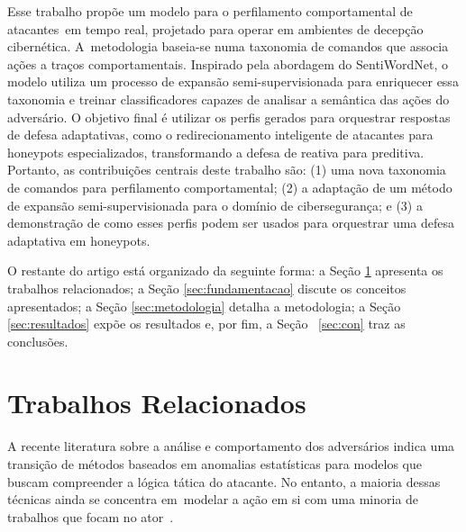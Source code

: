 \documentclass[12pt]{article}
\newcommand{\as}[1]{\textcolor{blue}{{\bf #1}}}
\newcommand{\tachar}[1]{\textcolor{red}{\sout{#1}}}
\begin{document}
Esse trabalho propõe um modelo para o perfilamento comportamental de atacantes~em tempo real, projetado para operar em ambientes de decepção cibernética. A~metodologia baseia-se numa taxonomia de comandos que associa ações a traços comportamentais. Inspirado pela abordagem do SentiWordNet\cite{sentiword3}, o modelo utiliza um processo de expansão semi-supervisionada para enriquecer essa taxonomia e treinar classificadores capazes de analisar a semântica das ações do adversário. O objetivo final é utilizar os perfis gerados para orquestrar respostas de defesa adaptativas,  como o redirecionamento inteligente de atacantes para honeypots especializados, transformando a defesa de reativa para preditiva. Portanto, as contribuições centrais deste trabalho são: (1) uma nova taxonomia de comandos para perfilamento comportamental; (2) a adaptação de um método de expansão semi-supervisionada para o domínio de cibersegurança; e (3) a demonstração de como esses perfis podem ser usados para orquestrar uma defesa adaptativa em honeypots.

O restante do artigo está organizado da seguinte forma: a Seção \ref{sec:trab} apresenta os trabalhos relacionados; a Seção \ref{sec:fundamentacao} discute os conceitos apresentados; a Seção \ref{sec:metodologia} detalha a metodologia; a Seção \ref{sec:resultados} expõe os resultados e, por fim, a Seção ~\ref{sec:con} traz as conclusões.

\section{Trabalhos Relacionados} 
\label{sec:trab}
A  recente literatura sobre a análise e comportamento dos adversários indica uma transição de métodos baseados em anomalias estatísticas para modelos que buscam compreender a lógica tática do atacante.
No entanto, a maioria dessas técnicas ainda se concentra em~modelar a ação em si \cite{du2017deeplog, vinay2024scade, lashkari2022atlas, veronica2023geo} com uma minoria de trabalhos que focam no ator~\cite{cranford2020adaptive, zhu2021defensive}.
%
%
\end{document}

